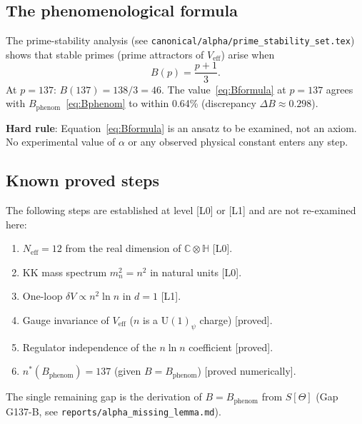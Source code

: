\documentclass[12pt,a4paper]{article}
\theoremstyle{definition}
\theoremstyle{remark}
\begin{document}
\subsection{The phenomenological formula}

The prime-stability analysis (see \texttt{canonical/alpha/prime\_stability\_set.tex})
shows that stable primes (prime attractors of $V_{\mathrm{eff}}$) arise when
\begin{equation}
  B(p) = \frac{p+1}{3}.
  \label{eq:Bformula}
\end{equation}
At $p = 137$: $B(137) = 138/3 = 46$.  The value~\eqref{eq:Bformula} at
$p = 137$ agrees with $B_{\mathrm{phenom}}$~\eqref{eq:Bphenom} to within 0.64\%
(discrepancy $\Delta B \approx 0.298$).

\begin{warnbox}
\textbf{Hard rule}: Equation~\eqref{eq:Bformula} is an ansatz to be examined,
not an axiom.  No experimental value of $\alpha$ or any observed physical
constant enters any step.
\end{warnbox}

\subsection{Known proved steps}

The following steps are established at level [L0] or [L1] and are not
re-examined here:

\begin{enumerate}
  \item $N_{\mathrm{eff}} = 12$ from the real dimension of $\mathbb{C}\otimes\mathbb{H}$ [L0].
  \item KK mass spectrum $m_n^2 = n^2$ in natural units [L0].
  \item One-loop $\delta V \propto n^2\ln n$ in $d=1$ [L1].
  \item Gauge invariance of $V_{\mathrm{eff}}$ ($n$ is a $\mathrm{U}(1)_\psi$ charge) [proved].
  \item Regulator independence of the $n\ln n$ coefficient [proved].
  \item $n^*(B_{\mathrm{phenom}}) = 137$ (given $B = B_{\mathrm{phenom}}$) [proved numerically].
\end{enumerate}

\noindent The single remaining gap is the derivation of $B = B_{\mathrm{phenom}}$
from $S[\Theta]$ (Gap G137-B, see \texttt{reports/alpha\_missing\_lemma.md}).

\end{document}
